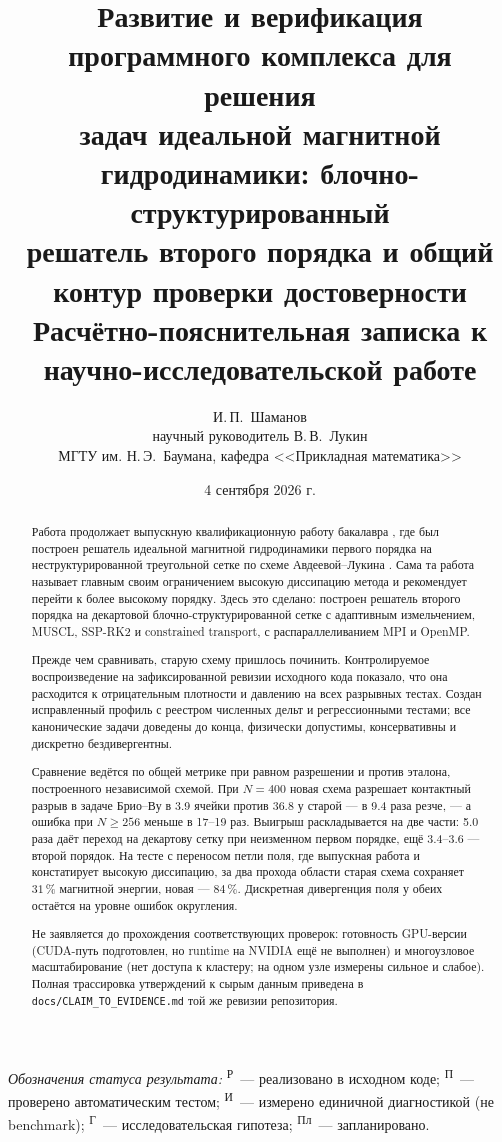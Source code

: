 \documentclass[12pt,a4paper]{article}
\title{Развитие и верификация программного комплекса для решения\\
задач идеальной магнитной гидродинамики: блочно-структурированный\\
решатель второго порядка и общий контур проверки достоверности\\[6pt]
\large Расчётно-пояснительная записка к научно-исследовательской работе}
\author{И.\,П.~Шаманов\\[2pt]
\normalsize научный руководитель В.\,В.~Лукин\\
\normalsize МГТУ им. Н.\,Э.~Баумана, кафедра <<Прикладная математика>>}
\date{4 сентября 2026 г.}
\newcommand{\code}[1]{\texttt{#1}}
\newcommand{\Rl}{\textsuperscript{\scriptsize Р}}   %
\newcommand{\Pv}{\textsuperscript{\scriptsize П}}   %
\newcommand{\Iz}{\textsuperscript{\scriptsize И}}    %
\newcommand{\Gp}{\textsuperscript{\scriptsize Г}}   %
\newcommand{\Pl}{\textsuperscript{\scriptsize Пл}}  %
\begin{document}
\maketitle

\begin{abstract}
\noindent
Работа продолжает выпускную квалификационную работу бакалавра
\cite{shamanov2025}, где был построен решатель идеальной магнитной
гидродинамики первого порядка на неструктурированной треугольной сетке по
схеме Авдеевой--Лукина \cite{avdeeva2019,galanin2007}. Сама та работа называет
главным своим ограничением высокую диссипацию метода и рекомендует перейти к
более высокому порядку. Здесь это сделано: построен решатель второго порядка на
декартовой блочно-структурированной сетке с адаптивным измельчением, MUSCL,
SSP-RK2 и constrained transport, с распараллеливанием MPI и OpenMP.

Прежде чем сравнивать, старую схему пришлось починить. Контролируемое
воспроизведение на зафиксированной ревизии исходного кода показало, что она
расходится к отрицательным плотности и давлению на всех разрывных тестах.
Создан исправленный профиль с реестром численных дельт и регрессионными
тестами; все канонические задачи доведены до конца, физически допустимы,
консервативны и дискретно бездивергентны.

Сравнение ведётся по общей метрике при равном разрешении и против эталона,
построенного независимой схемой. При $N=400$ новая схема разрешает контактный
разрыв в задаче Брио--Ву в 3.9 ячейки против 36.8 у старой --- в 9.4 раза
резче, --- а ошибка при $N\geq256$ меньше в 17--19 раз. Выигрыш раскладывается
на две части: 5.0 раза даёт переход на декартову сетку при неизменном первом
порядке, ещё 3.4--3.6 --- второй порядок. На тесте с переносом петли поля, где
выпускная работа и констатирует высокую диссипацию, за два прохода области
старая схема сохраняет $31\,\%$ магнитной энергии, новая --- $84\,\%$.
Дискретная дивергенция поля у обеих остаётся на уровне ошибок округления.

Не заявляется до прохождения соответствующих проверок: готовность
GPU-версии (CUDA-путь подготовлен, но runtime на NVIDIA ещё не выполнен) и
многоузловое масштабирование (нет доступа к кластеру; на одном
узле измерены сильное и слабое). Полная трассировка утверждений к сырым данным
приведена в \code{docs/CLAIM\_TO\_EVIDENCE.md} той же ревизии репозитория.
\end{abstract}

\medskip
\noindent\textit{Обозначения статуса результата:}
\Rl~--- реализовано в исходном коде;
\Pv~--- проверено автоматическим тестом;
\Iz~--- измерено единичной диагностикой (не benchmark);
\Gp~--- исследовательская гипотеза;
\Pl~--- запланировано.
\end{document}
